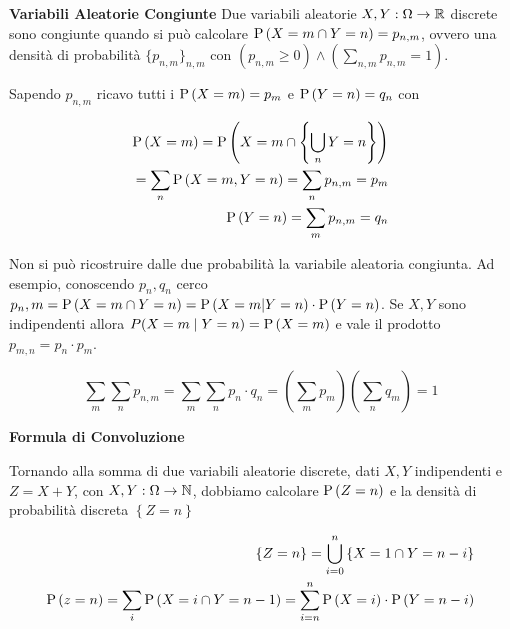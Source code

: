 \begin{defn}
    \textbf{Variabili Aleatorie Congiunte}
    Due variabili aleatorie $ X,Y : \Omega \to \mathbb{R} $ discrete sono congiunte quando si può calcolare $ \text{P}\left(X = m \cap Y = n\right) = p_{n,m} $, ovvero una densità di probabilità $ \{ p_{n,m} \}_{n,m} $ con $ (p_{n,m} \geq 0 ) \land (\sum_{n,m} p_{n,m} = 1) $.
    
    Sapendo $ p_{n,m} $ ricavo tutti i $ \text{P}\left(X=m\right) = p_m $ e $ \text{P}\left(Y = n\right) = q_n $ con
    
    \begin{equation*}
    \begin{aligned}
    \text{P}\left(X=m\right) = \text{P}\left(X = m \cap \left\{ \bigcup_{n} Y=n \right\}\right) \\
    = \sum_{n} \text{P}\left(X=m,Y=n\right) = \sum_n p_{n,m} = p_m \\
    \text{P}\left(Y=n\right) = \sum_{m} p_{n,m} = q_n
    \end{aligned}
    \end{equation*}
    
    Non si può ricostruire dalle due probabilità la variabile aleatoria congiunta.
    Ad esempio, conoscendo $ p_n,q_n $ cerco $ p_n,m  = \text{P}\left(X = m \cap Y = n\right) = \text{P}\left(X = m | Y = n\right) \cdot \text{P}\left(Y=n\right) $.
    Se $ X,Y $ sono indipendenti allora $ P(X=m \mid Y=n) = \text{P}\left(X=m\right) $ e vale il
    prodotto $ p_{m,n} = p_n \cdot p_m $.

    
    \begin{equation*}
    \sum_{m}\sum_{n} p_{n,m} = \sum_{m}\sum_{n} p_n \cdot q_n = \left( \sum_{m} p_m \right) \left( \sum_{n} q_m \right) = 1 
    \end{equation*}
\end{defn}


\begin{defn}
    \textbf{Formula di Convoluzione}
    
    Tornando alla somma di due variabili aleatorie discrete, dati $ X,Y $ indipendenti e $ Z = X + Y $, con $ X,Y : \Omega \to \mathbb{N} $, dobbiamo calcolare $ \text{P}\left(Z = n\right) $ e la densità di probabilità discreta $ \left\{Z = n\right\} $
    
    \begin{equation*}
    \begin{aligned}
    \left\{Z = n\right\} = \bigcup_{i=0}^{n} \left\{X = 1 \cap Y = n - i \right\} \\
    \text{P}\left(z=n\right) = \sum_{i} \text{P}\left(X = i \cap Y = n-1\right) = \sum_{i = n}^{n} \text{P}\left(X=i\right) \cdot \text{P}\left(Y=n-i\right)
    \end{aligned} 
    \end{equation*}
\end{defn}


